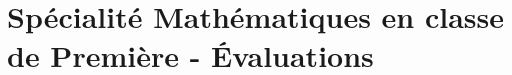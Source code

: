 \documentclass[a4paper,11pt]{article}
\author{Pierquet}
\title{\nomfichier}
\begin{document}
\pagestyle{fancy}

\part*{Spécialité Mathématiques en classe de Première - Évaluations}

\tableofcontents

\clearpage



\clearpage



\clearpage



\clearpage



\clearpage



\clearpage



\clearpage



\clearpage



\clearpage



\clearpage



\clearpage



\clearpage



\clearpage



\clearpage



\clearpage



\clearpage



\clearpage


\end{document}

